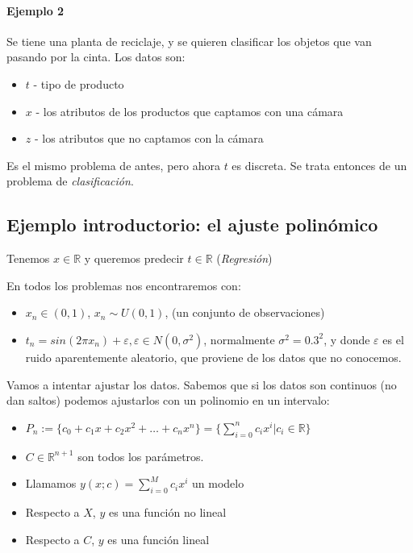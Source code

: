 \documentclass[a4paper,10pt]{article}
\begin{document}
\paragraph{Ejemplo 2}
Se tiene una planta de reciclaje, y se quieren clasificar los objetos que van pasando por la cinta. Los datos son:
\begin{itemize}
\item $t$ - tipo de producto
\item $x$ - los atributos de los productos que captamos con una cámara
\item $z$ - los atributos que no captamos con la cámara
\end{itemize}

Es el mismo problema de antes, pero ahora $t$ es discreta. Se trata entonces de un problema de \textit{clasificación}.

\subsection{Ejemplo introductorio: el ajuste polinómico}

Tenemos $x \in \mathbb{R}$ y queremos predecir $t \in \mathbb{R}$ (\textit{Regresión})

En todos los problemas nos encontraremos con:
\begin{itemize}
\item $x_n \in (0,1)$, $x_n \sim U(0,1) $, (un conjunto de observaciones)
\item $t_n = sin(2\pi x_n) + \varepsilon, \varepsilon \in N(0,\sigma^2)$, normalmente $\sigma^2 = 0.3^2$, y donde $\varepsilon$ es el ruido aparentemente aleatorio, que proviene de los datos que no conocemos.
\end{itemize}

Vamos a intentar ajustar los datos. Sabemos que si los datos son continuos (no dan saltos) podemos ajustarlos con un polinomio en un intervalo:
\begin{itemize}
\item $P_n := \{c_0 + c_1x + c_2x^2 + \dots + c_nx^n\} = \{\sum_{i = 0}^n c_ix^i | c_i \in \mathbb{R} \}$
\item $C \in \mathbb{R}^{n + 1}$ son todos los parámetros.
\item Llamamos $y(x;c) = \sum_{i = 0}^{M} c_ix^i$ un modelo
\item Respecto a $X$, $y$ es una función no lineal
\item Respecto a $C$, $y$ es una función lineal
\end{itemize}
\end{document}

